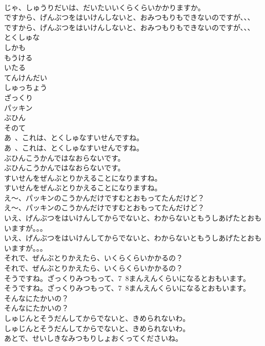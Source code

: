 \documentclass[8pt]{extreport}
\begin{document}
\begin{CJK}{UTF8}{min}
\\	じゃ、しゅうりだいは、だいたいいくらくらいかかりますか。
\\	ですから、げんぶつをはいけんしないと、おみつもりもできないのですが、、、
\\	ですから、げんぶつをはいけんしないと、おみつもりもできないのですが、、、
\\	とくしゅな
\\	しかも
\\	もうける
\\	いたる
\\	てんけんだい
\\	しゅっちょう
\\	ざっくり
\\	パッキン
\\	ぶひん
\\	そのて
\\	あ~、これは、とくしゅなすいせんですね。
\\	あ~、これは、とくしゅなすいせんですね。
\\	ぶひんこうかんではなおらないです。
\\	ぶひんこうかんではなおらないです。
\\	すいせんをぜんぶとりかえることになりますね。
\\	すいせんをぜんぶとりかえることになりますね。
\\	え～、パッキンのこうかんだけですむとおもってたんだけど？
\\	え～、パッキンのこうかんだけですむとおもってたんだけど？
\\	いえ、げんぶつをはいけんしてからでないと、わからないともうしあげたとおもいますが。。。
\\	いえ、げんぶつをはいけんしてからでないと、わからないともうしあげたとおもいますが。。。
\\	それで、ぜんぶとりかえたら、いくらくらいかかるの？
\\	それで、ぜんぶとりかえたら、いくらくらいかかるの？
\\	そうですね。ざっくりみつもって、7~8まんえんくらいになるとおもいます。
\\	そうですね。ざっくりみつもって、7~8まんえんくらいになるとおもいます。
\\	そんなにたかいの？
\\	そんなにたかいの？
\\	しゅじんとそうだんしてからでないと、きめられないわ。
\\	しゅじんとそうだんしてからでないと、きめられないわ。
\\	あとで、せいしきなみつもりしょおくってくださいね。

\end{CJK}
\end{document}
